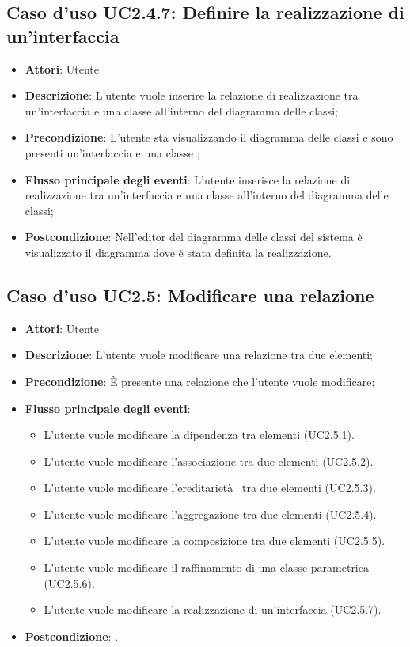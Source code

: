 \documentclass[../AnalisiDeiRequisiti.tex]{subfiles}
\begin{document}
		\subsection{Caso d'uso UC2.4.7: Definire la realizzazione di un'interfaccia}
		\begin{itemize}
			\item \textbf{Attori}: Utente
			\item \textbf{Descrizione}: L'utente vuole inserire la relazione di realizzazione tra  un'interfaccia e una classe all'interno del diagramma delle classi;
			\item \textbf{Precondizione}: L'utente sta visualizzando il diagramma delle classi e sono presenti un'interfaccia e una classe ;
			\item \textbf{Flusso principale degli eventi}: L'utente inserisce la relazione di realizzazione tra  un'interfaccia e una classe all'interno del diagramma delle classi;
			\item \textbf{Postcondizione}: Nell'editor del diagramma delle classi del sistema è visualizzato il diagramma dove è stata definita la realizzazione.
		\end{itemize}
		\subsection{Caso d'uso UC2.5: Modificare una relazione}
		\begin{itemize}
			\item \textbf{Attori}: Utente
			\item \textbf{Descrizione}: L'utente vuole modificare una relazione tra due elementi;
			\item \textbf{Precondizione}: È presente una relazione che l'utente vuole modificare;
			\item \textbf{Flusso principale degli eventi}: \begin{itemize}
				\item L'utente vuole modificare la dipendenza tra elementi (UC2.5.1).
				\item L'utente vuole modificare l'associazione tra due elementi (UC2.5.2).
				\item L'utente vuole modificare l'ereditarietà  tra due elementi (UC2.5.3).
				\item L'utente vuole modificare l'aggregazione tra due elementi (UC2.5.4).
				\item L'utente vuole modificare la composizione tra due elementi (UC2.5.5).
				\item L'utente vuole modificare il raffinamento di una classe parametrica (UC2.5.6).
				\item L'utente vuole modificare la realizzazione di un'interfaccia (UC2.5.7).
			\end{itemize}
			\item \textbf{Postcondizione}: .
		\end{itemize}
\end{document}
